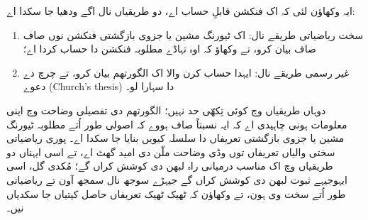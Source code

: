 \documentclass[../../../include/open-logic-section]{subfiles}
\begin{document}
ایہ وکھاؤن لئی کہ اک فنکشن قابلِ حساب اے، دو طریقیاں نال
اگے ودھیا جا سکدا اے:
\begin{enumerate}
\item سخت ریاضیاتی طریقے نال: اک ٹیورنگ مشین یا جزوی بازگشتی
  فنکشن نوں صاف صاف بیان کرو، تے وکھاؤ کہ اوہ تہاڈے مطلوبہ
  فنکشن دا حساب کردا اے؛
\item غیر رسمی طریقے نال: ایہدا حساب کرن والا اک الگورتھم بیان
  کرو، تے چرچ دے دعوے (Church's thesis) دا سہارا لو۔
\end{enumerate}
دوہاں طریقیاں وچ کوئی تِکھّی حد نہیں؛ الگورتھم دی تفصیلی وضاحت
وچ اینی معلومات ہونی چاہیدی اے کہ ایہ نسبتاً صاف ہووے کہ اصولی
طور اُتے مطلوبہ ٹیورنگ مشین یا جزوی بازگشتی تعریفاں دا سلسلہ
کیویں بنایا جا سکدا اے۔ پوری ریاضیاتی سختی والیاں تعریفاں توں
وڈی وضاحت ملّن دی امید گھٹ اے، تے اسی ایہناں دو طریقیاں وچ
اک مناسب درمیانی راہ لبھن دی کوشش کراں گے؛ مُکدی گل، اسی
ایہوجیہے ثبوت لبھن دی کوشش کراں گے جیہڑے سوجھ نال سمجھ آون
تے ریاضیاتی طور اُتے سخت وی ہون، تے وکھاؤن کہ ٹھیک
ٹھیک تعریفاں حاصل کیتیاں جا سکدیاں نیں۔
\end{document}
